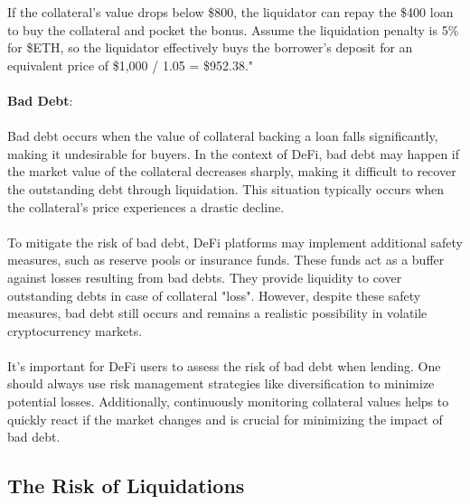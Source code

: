\documentclass{article}
\begin{document}
If the collateral’s value drops below \$800, the liquidator can repay the \$400 loan to buy the collateral and pocket the bonus. Assume the  liquidation penalty is 5\% for \$ETH, so the liquidator effectively buys the borrower’s deposit for an equivalent price of \$1,000 / 1.05 = \$952.38."\\\\\textbf{Bad Debt}:\\\\Bad debt occurs when the value of collateral backing a loan falls significantly, making it undesirable for buyers. In the context of DeFi, bad debt may happen if the market value of the collateral decreases sharply, making it difficult to recover the outstanding debt through liquidation. This situation typically occurs when the collateral's price experiences a drastic decline.\\\\To mitigate the risk of bad debt, DeFi platforms may implement additional safety measures, such as reserve pools or insurance funds. These funds act as a buffer against losses resulting from bad debts. They provide liquidity to cover outstanding debts in case of collateral "loss". However, despite these safety measures, bad debt still occurs and remains a realistic possibility in volatile cryptocurrency markets.\\\\It's important for DeFi users to assess the risk of bad debt when lending. One should always use risk management strategies like diversification to minimize potential losses. Additionally, continuously monitoring collateral values helps to quickly react if the market changes and is crucial for minimizing the impact of bad debt.
\subsection{The Risk of Liquidations}
\end{document}
